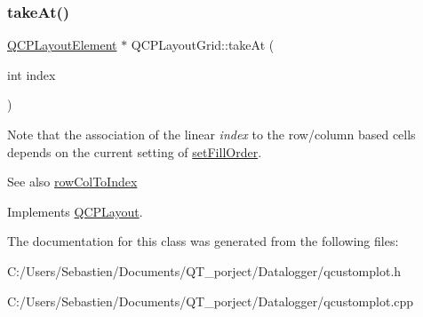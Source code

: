 \mbox{\label{class_q_c_p_layout_grid_a17dd220234d1bbf8835abcc666384d45}} 
\subsubsection{\texorpdfstring{take\+At()}{takeAt()}}
{\footnotesize\ttfamily \hyperlink{class_q_c_p_layout_element}{Q\+C\+P\+Layout\+Element} $\ast$ Q\+C\+P\+Layout\+Grid\+::take\+At (\begin{DoxyParamCaption}\item[{int}]{index }\end{DoxyParamCaption})\hspace{0.3cm}{\ttfamily [virtual]}}

Note that the association of the linear {\itshape index} to the row/column based cells depends on the current setting of \hyperlink{class_q_c_p_layout_grid_affc2f3cfd22f28698c5b29b960d2a391}{set\+Fill\+Order}.

\begin{DoxySeeAlso}{See also}
\hyperlink{class_q_c_p_layout_grid_a682ba76f130810ffd294032a1bfbcfcb}{row\+Col\+To\+Index} 
\end{DoxySeeAlso}


Implements \hyperlink{class_q_c_p_layout_a5a79621fa0a6eabb8b520cfc04fb601a}{Q\+C\+P\+Layout}.



The documentation for this class was generated from the following files\+:\begin{DoxyCompactItemize}
\item 
C\+:/\+Users/\+Sebastien/\+Documents/\+Q\+T\+\_\+porject/\+Datalogger/qcustomplot.\+h\item 
C\+:/\+Users/\+Sebastien/\+Documents/\+Q\+T\+\_\+porject/\+Datalogger/qcustomplot.\+cpp\end{DoxyCompactItemize}
